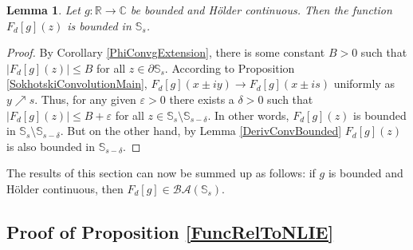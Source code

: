 \documentclass[12pt]{article}
\theoremstyle{plain}
\newtheorem{lemma}[theorem]{Lemma}
\theoremstyle{definition}
\numberwithin{equation}{section}
\numberwithin{theorem}{section}
\begin{document}
\begin{lemma} \label{PhiConvgBounded}
Let $g:\mathbb{R}\rightarrow\mathbb{C}$ be bounded and H\"older continuous. Then the function $F_d[g](z)$ is bounded in $\mathbb{S}_s$.
\end{lemma}

\begin{proof}
By Corollary \ref{PhiConvgExtension}, there is some constant $B>0$ such that $|F_d[g](z)|\leq B$ for all $z\in\partial\mathbb{S}_s$. According to Proposition \ref{SokhotskiConvolutionMain}, $F_d[g](x\pm iy)\rightarrow F_d[g](x\pm is)$ uniformly as $y\nearrow s$. Thus, for any given $\varepsilon >0$ there exists a $\delta>0$ such that $|F_d[g](z)|\leq B+\varepsilon$ for all $z\in\mathbb{S}_s\setminus\mathbb{S}_{s-\delta}$. In other words, $F_d[g](z)$ is bounded in $\mathbb{S}_s\setminus\mathbb{S}_{s-\delta}$. But on the other hand, by Lemma \ref{DerivConvBounded} $F_d[g](z)$ is also bounded in $\mathbb{S}_{s-\delta}$.
\end{proof}

The results of this section can now be summed up as follows: if $g$ is bounded and H\"older continuous, then $F_d[g]\in\mathcal{BA}(\mathbb{S}_s)$.


\subsection{Proof of Proposition \ref{FuncRelToNLIE}}
\label{GreenSoln}
\end{document}
